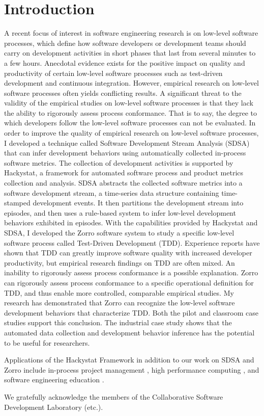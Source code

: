 \documentclass[smallextended]{svjour3}     %
\begin{document}
\section{Introduction}
\label{intro}
A recent focus of interest in software engineering research is on low-level
software processes, which define how software developers or development
teams should carry on development activities in short phases that last from
several minutes to a few hours. Anecdotal evidence exists for the positive
impact on quality and productivity of certain low-level software processes
such as test-driven development and continuous integration. However,
empirical research on low-level software processes often yields conflicting
results. A significant threat to the validity of the empirical studies on
low-level software processes is that they lack the ability to rigorously
assess process conformance. That is to say, the degree to which developers
follow the low-level software processes can not be evaluated. In order to
improve the quality of empirical research on low-level software processes,
I developed a technique called Software Development Stream Analysis (SDSA)
that can infer development behaviors using automatically collected
in-process software metrics. The collection of development activities is
supported by Hackystat, a framework for automated software process and
product metrics collection and analysis. SDSA abstracts the collected
software metrics into a software development stream, a time-series data
structure containing time-stamped development events. It then partitions
the development stream into episodes, and then uses a rule-based system to
infer low-level development behaviors exhibited in episodes. With the
capabilities provided by Hackystat and SDSA, I developed the Zorro software
system to study a specific low-level software process called Test-Driven
Development (TDD). Experience reports have shown that TDD can greatly
improve software quality with increased developer productivity, but
empirical research findings on TDD are often mixed. An inability to
rigorously assess process conformance is a possible explanation. Zorro can
rigorously assess process conformance to a specific operational definition
for TDD, and thus enable more controlled, comparable empirical studies. My
research has demonstrated that Zorro can recognize the low-level software
development behaviors that characterize TDD. Both the pilot and classroom
case studies support this conclusion. The industrial case study shows that
the automated data collection and development behavior inference has the
potential to be useful for researchers.

Applications of the Hackystat Framework in addition to our work on SDSA and
Zorro include in-process project management \cite{csdl2-04-11}, high
performance computing \cite{csdl2-04-22}, and software engineering
education \cite{csdl2-03-12}.

\begin{acknowledgements}
We gratefully acknowledge the members of the Collaborative Software Development Laboratory (etc.).
\end{acknowledgements}


\end{document}
